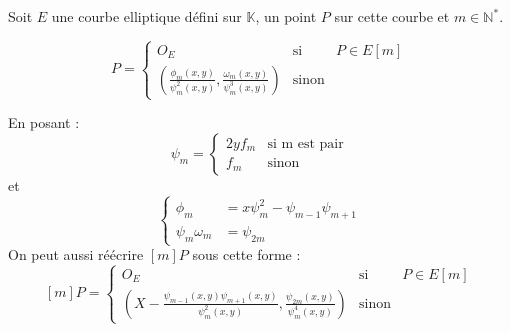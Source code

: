 \documentclass{article}
\begin{document}
\begin{thm}
Soit $E$ une courbe elliptique défini sur $\mathbb{K}$, un point $P$ sur cette courbe et $m \in \mathbb{N}^*$.

\begin{equation}
[m]P = 
\left\lbrace
\begin{array}{ccc}
O_E & \mbox{si} & P \in E[m]  \\
\left(    \frac{\phi_m(x,y)}{\psi^2_m(x,y)}, \frac{\omega_m(x,y)}{\psi^3_m(x,y)}\right) & \mbox{sinon}  & 
\end{array}\right.
\end{equation}

En posant : 
\begin{equation*}
\psi_m= \left\lbrace
\begin{array}{cc}
2yf_m & \mbox{si m est pair} \\
f_m & \mbox{sinon}
\end{array}\right.
\end{equation*}
et 
\begin{equation*}
\left\lbrace
\begin{array}{ll}
\phi_m &= x \psi^2_m - \psi_{m-1}\psi_{m+1} \\
\psi_m \omega_m &= \psi_{2m}
\end{array}\right.
\end{equation*}
On peut aussi réécrire $[m]P$ sous cette forme : 
\begin{equation}\label{mP}
[m]P = \left\lbrace
\begin{array}{lll}
O_E & \mbox{si} & P \in E[m]  \\
\left(  X -   \frac{\psi_{m-1}(x,y)\psi_{m+1}(x,y)}{\psi^2_m(x,y)}, \frac{\psi_{2m}(x,y)}{\psi^4_m(x,y)}\right) & \mbox{sinon}  & 
\end{array}\right.
\end{equation}
\end{thm}
\end{document}
